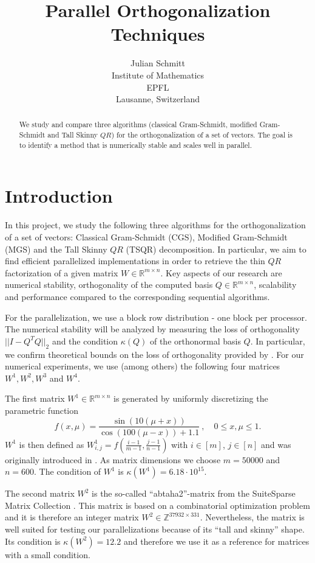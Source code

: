 \documentclass{article}
\title{Parallel Orthogonalization Techniques}
\author{%
  Julian Schmitt \\
  Institute of Mathematics \\
  EPFL \\
  Lausanne, Switzerland
}
\begin{document}
\maketitle


\begin{abstract}
    We study and compare three algorithms (classical Gram-Schmidt, modified
    Gram-Schmidt and Tall Skinny $QR$) for the orthogonalization of a set of
    vectors. The goal is to identify a method that is numerically stable and
    scales well in parallel.
\end{abstract}


\section{Introduction}
In this project, we study the following three algorithms for the
orthogonalization of a set of vectors: Classical Gram-Schmidt (CGS), Modified
Gram-Schmidt (MGS) and the Tall Skinny $QR$ (TSQR) decomposition. In particular,
we aim to find efficient parallelized implementations in order to retrieve the
thin $QR$ factorization of a given matrix $W \in \mathbb{R}^{m \times n}$. Key
aspects of our research are numerical stability, orthogonality of the computed
basis $Q \in \mathbb{R}^{m \times n}$, scalability and performance compared to
the corresponding sequential algorithms.

For the parallelization, we use a block row distribution - one block per
processor. The numerical stability will be analyzed by measuring the loss of
orthogonality $||I - Q^T Q||_2$ and the condition $\kappa(Q)$ of the
orthonormal basis $Q$. In particular, we confirm theoretical bounds on the loss
of orthogonality provided by \cite{Grigori:2023}. For our numerical experiments,
we use (among others) the following four matrices $W^1, W^2, W^3$ and $W^4$.

The first matrix $W^1 \in \mathbb{R}^{m \times n}$ is generated by uniformly
discretizing the parametric function
\begin{equation*}
    f(x, \mu) = \frac{\sin (10 (\mu + x))}{\cos (100 (\mu - x)) + 1.1} \ ,
    \quad 0 \leq x, \mu \leq 1.
\end{equation*}
$W^1$ is then defined as $W_{i,j}^1 = f(\frac{i - 1}{m - 1}, \frac{j - 1}{n -
1})$ with $i \in [m]$, $j \in [n]$ and was originally introduced in
\cite{BalabanovGrigori:2022}. As matrix dimensions we choose $m = 50000$ and $n
= 600$. The condition of $W^1$ is $\kappa(W^1) = 6.18\cdot10^{15}$.

The second matrix $W^2$ is the so-called \enquote{abtaha2}-matrix from the
SuiteSparse Matrix Collection \cite{DavisHu:2011}. This matrix is based on a
combinatorial optimization problem and it is therefore an integer matrix $W^2
\in \mathbb{Z}^{37932 \times 331}$. Nevertheless, the matrix is well suited for
testing our parallelizations because of its \enquote{tall and skinny} shape. Its
condition is $\kappa(W^2) = 12.2$ and therefore we use it as a reference for
matrices with a small condition.
\end{document}
